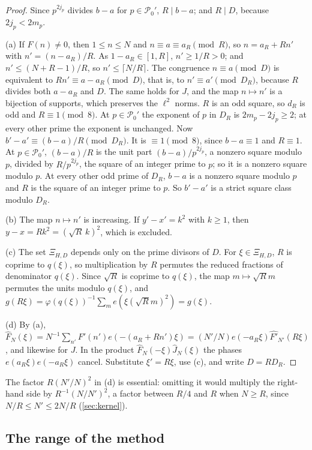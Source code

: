 \begin{proof}
Since $p^{2j_p}$ divides $b-a$ for $p\in\mathcal P_0'$, $R\mid b-a$; and
$R\mid D$, because $2j_p<2m_p$.

(a) If $F(n)\ne0$, then $1\le n\le N$ and $n\equiv a\equiv a_R\pmod R$, so
$n=a_R+Rn'$ with $n'=(n-a_R)/R$. As $1-a_R\in[1,R]$, $n'\ge1/R>0$; and
$n'\le(N+R-1)/R$, so $n'\le\lceil N/R\rceil$. The congruence $n\equiv a\pmod D$
is equivalent to $Rn'\equiv a-a_R\pmod D$, that is, to $n'\equiv a'\pmod{D_R}$,
because $R$ divides both $a-a_R$ and $D$. The same holds for $J$, and the map
$n\mapsto n'$ is a bijection of supports, which preserves the $\ell^2$ norms.
$R$ is an odd square, so $d_R$ is odd and $R\equiv1\pmod8$. At
$p\in\mathcal P_0'$ the exponent of $p$ in $D_R$ is $2m_p-2j_p\ge2$; at every
other prime the exponent is unchanged. Now $b'-a'\equiv(b-a)/R\pmod{D_R}$. It
is $\equiv1\pmod8$, since $b-a\equiv1$ and $R\equiv1$. At $p\in\mathcal P_0'$,
$(b-a)/R$ is the unit part $(b-a)/p^{2j_p}$, a nonzero square modulo $p$,
divided by $R/p^{2j_p}$, the square of an integer prime to $p$; so it is a
nonzero square modulo $p$. At every other odd prime of $D_R$, $b-a$ is a
nonzero square modulo $p$ and $R$ is the square of an integer prime to $p$.
So $b'-a'$ is a strict square class modulo $D_R$.

(b) The map $n\mapsto n'$ is increasing. If $y'-x'=k^2$ with $k\ge1$, then
$y-x=Rk^2=(\sqrt R\,k)^2$, which is excluded.

(c) The set $\Xi_{H,D}$ depends only on the prime divisors of $D$. For
$\xi\in\Xi_{H,D}$, $R$ is coprime to $q(\xi)$, so multiplication by $R$
permutes the reduced fractions of denominator $q(\xi)$. Since $\sqrt R$ is
coprime to $q(\xi)$, the map $m\mapsto\sqrt Rm$ permutes the units modulo
$q(\xi)$, and $g(R\xi)=\varphi(q(\xi))^{-1}\sum_me(\xi(\sqrt Rm)^2)=g(\xi)$.

(d) By (a), $\widehat F_N(\xi)=N^{-1}\sum_{n'}F'(n')e(-(a_R+Rn')\xi)
=(N'/N)e(-a_R\xi)\widehat{F'}_{N'}(R\xi)$, and likewise for $J$. In the product
$\widehat F_N(-\xi)\widehat J_N(\xi)$ the phases $e(a_R\xi)e(-a_R\xi)$ cancel.
Substitute $\xi'=R\xi$, use (c), and write $D=RD_R$.
\end{proof}

The factor $R(N'/N)^2$ in (d) is essential: omitting it would
multiply the right-hand side by $R^{-1}(N/N')^2$, a factor between
$R/4$ and $R$ when $N\ge R$, since $N/R\le N'\le2N/R$
(\cref{sec:kernel}).

\subsection{The range of the method}

